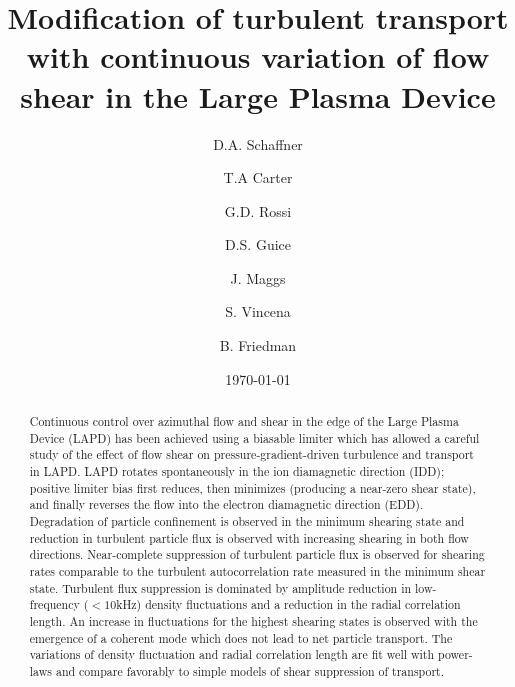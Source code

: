 \documentclass[aps,prl,amsmath,amssymb,preprint,superscriptaddress]{revtex4}
\begin{document}
\title{Modification of turbulent transport with continuous variation of
  flow shear in the Large Plasma Device}
\author{D.A. Schaffner}
\author{T.A Carter}
\author{G.D. Rossi}
\author{D.S. Guice}
\author{J. Maggs}
\author{S. Vincena}
\author{B. Friedman}


\date{\today}

\begin{abstract}
Continuous control over azimuthal flow and shear in the edge of the Large Plasma Device (LAPD) has been achieved using a biasable limiter which has allowed a careful study of the effect of flow shear on pressure-gradient-driven turbulence and transport in LAPD. LAPD rotates spontaneously in the ion diamagnetic direction (IDD); positive limiter bias first reduces, then minimizes (producing a near-zero shear state), and finally reverses the flow into the electron diamagnetic direction (EDD). Degradation of particle confinement is observed in the minimum shearing state and reduction in turbulent particle flux is observed with increasing shearing in both flow directions. Near-complete suppression of turbulent particle flux is observed for shearing rates comparable to the turbulent autocorrelation rate measured in the minimum shear state.  Turbulent flux suppression is dominated by amplitude reduction in low-frequency ($<10$kHz) density fluctuations and a reduction in the radial correlation length. An increase in fluctuations for the highest shearing states is observed with the emergence of a coherent mode which does not lead to net particle transport. The variations of density fluctuation and radial correlation length are fit well with power-laws and compare favorably to simple models of shear suppression of transport.
\end{abstract}
\end{document}
